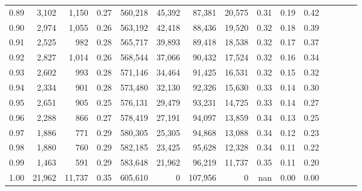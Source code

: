 \begin{tabular}{rrrcrrrrrrrrrrr}
0.89 &   3,102 &   1,150 &                                       0.27 &  560,218 &   45,392 &   87,381 &   20,575 &  0.31 &  0.19 &                         0.42 \\
0.90 &   2,974 &   1,055 &                                       0.26 &  563,192 &   42,418 &   88,436 &   19,520 &  0.32 &  0.18 &                         0.39 \\
0.91 &   2,525 &     982 &                                       0.28 &  565,717 &   39,893 &   89,418 &   18,538 &  0.32 &  0.17 &                         0.37 \\
0.92 &   2,827 &   1,014 &                                       0.26 &  568,544 &   37,066 &   90,432 &   17,524 &  0.32 &  0.16 &                         0.34 \\
0.93 &   2,602 &     993 &                                       0.28 &  571,146 &   34,464 &   91,425 &   16,531 &  0.32 &  0.15 &                         0.32 \\
0.94 &   2,334 &     901 &                                       0.28 &  573,480 &   32,130 &   92,326 &   15,630 &  0.33 &  0.14 &                         0.30 \\
0.95 &   2,651 &     905 &                                       0.25 &  576,131 &   29,479 &   93,231 &   14,725 &  0.33 &  0.14 &                         0.27 \\
0.96 &   2,288 &     866 &                                       0.27 &  578,419 &   27,191 &   94,097 &   13,859 &  0.34 &  0.13 &                         0.25 \\
0.97 &   1,886 &     771 &                                       0.29 &  580,305 &   25,305 &   94,868 &   13,088 &  0.34 &  0.12 &                         0.23 \\
0.98 &   1,880 &     760 &                                       0.29 &  582,185 &   23,425 &   95,628 &   12,328 &  0.34 &  0.11 &                         0.22 \\
0.99 &   1,463 &     591 &                                       0.29 &  583,648 &   21,962 &   96,219 &   11,737 &  0.35 &  0.11 &                         0.20 \\
1.00 &  21,962 &  11,737 &                                       0.35 &  605,610 &        0 &  107,956 &        0 &   nan &  0.00 &                         0.00 \\
\bottomrule
\end{tabular}
